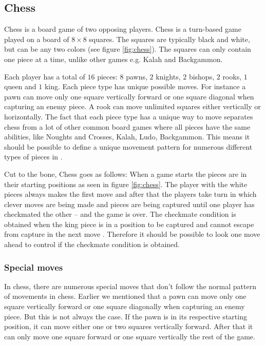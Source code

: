 \subsection{Chess}
Chess is a board game of two opposing players. Chess is a turn-based game played
on a board of $8 \times 8$ squares. The squares are typically black and white,
but can be any two colors (see figure \ref{fig:chess}). The squares can only
contain one piece at a time, unlike other games e.g. Kalah and Backgammon. 

Each player has a total of $16$ pieces: $8$ pawns, $2$ knights, $2$
bishops, $2$ rooks, $1$ queen and $1$ king. Each piece type has unique
possible moves. For instance a pawn can move only one square vertically
forward or one square diagonal when capturing an enemy piece. A rook
can move unlimited squares either vertically or horizontally. The fact
that each piece type has a unique way to move separates chess from a lot
of other common board games where all pieces have the same abilities,
like Noughts and Crosses, Kalah, Ludo, Backgammon. This means it should
be possible to define a unique movement pattern for numerous different
types of pieces in \productname{}.

Cut to the bone, Chess goes as follows: When a game starts the pieces are in their
starting positions as seen in figure \ref{fig:chess}. The player with the white
pieces always makes the first move and after that the players take turn in
which clever moves are being made and pieces are being captured until one
player has checkmated the other -- and the game is over. The checkmate condition
is obtained when the king piece is in a position to be captured and cannot
escape from capture in the next move \cite{chessrules}. Therefore it should be
possible to look one move ahead to control if the checkmate condition is
obtained.

\subsubsection{Special moves} 
In chess, there are numerous special moves that don't follow the normal pattern
of movements in chess. Earlier we mentioned that a pawn can move only one square
vertically forward or one square diagonally when capturing an enemy piece. But
this is not always the case. If the pawn is in its respective starting position, it
can move either one or two squares vertically forward. After that it can only
move one square forward or one square vertically the rest of the game. 

